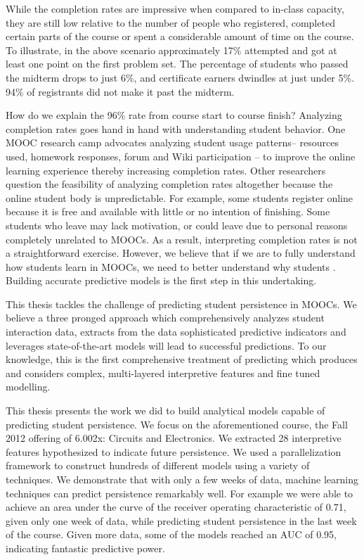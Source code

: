 While the completion rates are impressive when compared to in-class capacity, they are still low relative to the number of people who registered, completed certain parts of the course or spent a considerable amount of time on the course. To illustrate, in the above scenario approximately 17\% attempted and got at least one point on the first problem set. The percentage of students who passed the midterm drops to just 6\%, and certificate earners dwindles at just under 5\%. 94\% of registrants did not make it past the midterm.

How do we explain the 96\% \sti rate from course start to course finish? Analyzing completion rates goes hand in hand with understanding student behavior. One MOOC research camp advocates analyzing student usage patterns-- resources used, homework responses, forum and Wiki participation -- to improve the online learning experience thereby increasing completion rates. Other researchers question the feasibility of analyzing completion rates altogether because the online student body is unpredictable. For example, some students register online because it is free and available with little or no intention of finishing. Some students who leave may lack motivation, or could leave due to personal reasons completely unrelated to MOOCs. As a result, interpreting completion rates is not a straightforward exercise. However, we believe that if we are to fully understand how students learn in MOOCs, we need to better understand why students \sti. Building accurate predictive models is the first step in this undertaking. 

This thesis tackles the challenge of predicting student persistence in MOOCs. We believe a three pronged approach which comprehensively analyzes student interaction data, extracts from the data sophisticated predictive indicators and leverages state-of-the-art models will lead to successful predictions. To our knowledge, this is the first comprehensive treatment of predicting \sti which produces and considers complex, multi-layered interpretive features and fine tuned modelling. 

This thesis presents the work we did to build analytical models capable of predicting student persistence. We focus on the aforementioned course, the Fall 2012 offering of 6.002x: Circuits and Electronics. We extracted 28 interpretive features hypothesized to indicate future persistence. We used a parallelization framework to construct hundreds of different models using a variety of techniques. We demonstrate that with only a few weeks of data, machine learning techniques can predict persistence remarkably well. For example we were able to achieve an area under the curve of the receiver operating characteristic of 0.71, given only one week of data, while predicting student persistence in the last week of the course. Given more data, some of the models reached an AUC of 0.95, indicating fantastic predictive power.

